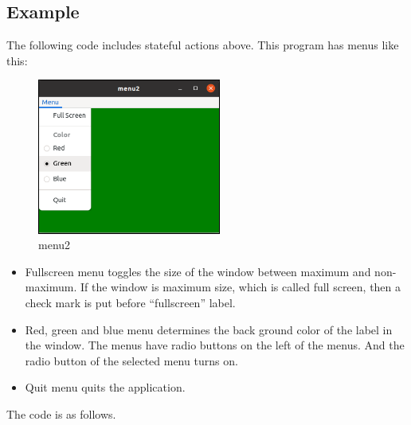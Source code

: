 \subsection{Example}\label{example}

The following code includes stateful actions above. This program has
menus like this:

\begin{figure}
\centering
\includegraphics[width=6.03cm,height=5.115cm]{../image/menu2.png}
\caption{menu2}
\end{figure}

\begin{itemize}
\tightlist
\item
  Fullscreen menu toggles the size of the window between maximum and
  non-maximum. If the window is maximum size, which is called full
  screen, then a check mark is put before ``fullscreen'' label.
\item
  Red, green and blue menu determines the back ground color of the label
  in the window. The menus have radio buttons on the left of the menus.
  And the radio button of the selected menu turns on.
\item
  Quit menu quits the application.
\end{itemize}

The code is as follows.

